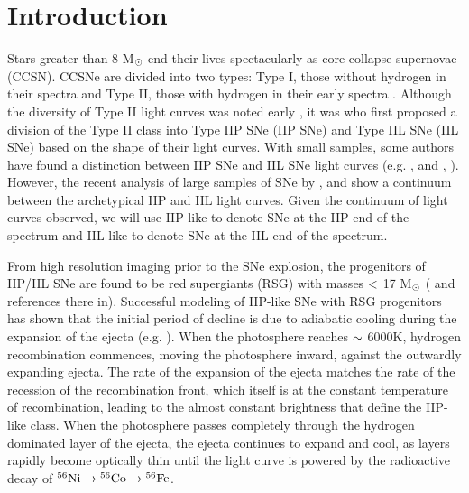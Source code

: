 \documentclass[a4paper,fleqn,usenatbib]{mnras}
\newcommand{\msun}{M$\rm{_{\odot}}$ }
\begin{document}
\section{Introduction}
Stars greater than 8 \msun end their lives spectacularly as core-collapse supernovae (CCSN). 
CCSNe are divided into two types: Type I, those without hydrogen in their spectra and Type II, those with hydrogen in their early spectra \citep{1941minkowski}.
Although the diversity of Type II light curves was noted early \citep{1964minkowski, 1967pskovskii}, it was \citet{1979barbon} who first proposed a division of the Type II class into Type IIP SNe (IIP SNe) and Type IIL SNe (IIL SNe) based on the shape of their light curves.
With small samples, some authors have found a distinction between IIP SNe and IIL SNe light curves  (e.g. \citealt{1993patat}, and \citealt{1994patat}, \citealt{2012arcavi}).
However, the recent analysis of large samples of SNe by \citet{2014anderson, 2014faran,2015sanders,2016valenti,2016galbany}, and \citet{2016rubin} show a continuum between the archetypical IIP and IIL light curves. 
Given the continuum of light curves observed, we will use IIP-like to denote SNe at the IIP end of the spectrum and IIL-like to denote SNe at the IIL end of the spectrum.

From high resolution imaging prior to the SNe explosion, the progenitors of IIP/IIL SNe are found to be red supergiants (RSG) with masses $\rm{<}$ 17  \msun (\citealt{2015smartt2} and references there in).
Successful modeling of IIP-like SNe with RSG progenitors has shown that the initial period of decline is due to adiabatic cooling during the expansion of the ejecta (e.g. \citealt{1971grassberg,1977falk,1993blinnikov,2009kasen}).  
When the photosphere reaches $\rm{\sim}$ 6000K, hydrogen recombination commences, moving the photosphere inward, against the outwardly expanding ejecta. 
The rate of the expansion of the ejecta matches the rate of the recession of the recombination front, which itself is at the constant temperature of recombination, leading to the almost constant brightness that define the IIP-like class.
When the photosphere passes completely through the hydrogen dominated layer of the ejecta, the ejecta continues to expand and cool, as layers rapidly become optically thin until the light curve is powered by the radioactive decay of $\rm{{}^{56}Ni \rightarrow {}^{56}Co \rightarrow {}^{56}Fe}$.
\end{document}
